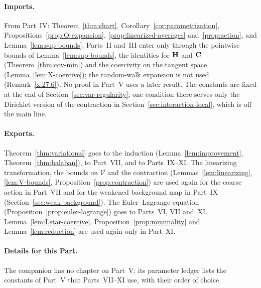 \paragraph{Imports.} From Part~IV: Theorem~\ref{thm:chart}, Corollary~\ref{cor:parametrization}, Propositions~\ref{prop:Q-expansion}, \ref{prop:linearized-averages} and~\ref{prop:action}, and Lemma~\ref{lem:sup-bounds}. Parts~II and~III enter only through the pointwise bounds of Lemma~\ref{lem:sup-bounds}, the identities for $\mathbf H$ and $\mathbf C$ (Theorem~\ref{thm:cov-min}) and the coercivity on the tangent space (Lemma~\ref{lem:X-coercive}); the random-walk expansion is not used (Remark~\ref{x:27.6}). No proof in Part~V uses a later result. The constants are fixed at the end of Section~\ref{sec:var-regularity}; one condition there serves only the Dirichlet version of the contraction in Section~\ref{sec:interaction-local}, which is off the main line.

\paragraph{Exports.} Theorem~\ref{thm:variational} goes to the induction (Lemma~\ref{lem:improvement}, Theorem~\ref{thm:balaban}), to Part~VII, and to Parts~IX--XI. The linearizing transformation, the bounds on $\mathcal V$ and the contraction (Lemmas~\ref{lem:linearizing}, \ref{lem:V-bounds}, Proposition~\ref{prop:contraction}) are used again for the coarse action in Part~VII and for the weakened background map in Part~IX (Section~\ref{sec:weak-background}). The Euler--Lagrange equation (Proposition~\ref{prop:euler-lagrange}) goes to Parts~VI, VII and~XI. Lemma~\ref{lem:Lstar-coercive}, Proposition~\ref{prop:minimality} and Lemma~\ref{lem:reduction} are used again only in Part~XI.

\paragraph{Details for this Part.} The companion has no chapter on Part~V; its parameter ledger lists the constants of Part~V that Parts~VII--XI use, with their order of choice.
